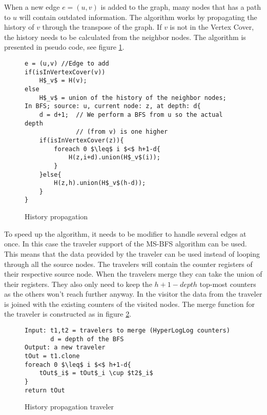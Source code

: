 When a new edge $e = (u,v)$ is added to the graph, many nodes that has a path to $u$ will contain outdated information. The algorithm works by propagating the history of $v$ through the transpose of the graph. If $v$ is not in the Vertex Cover, the history needs to be calculated from the neighbor nodes. The algorithm is presented in pseudo code, see figure \ref{fig:history_propagation_algorithm}.

\begin{figure}[h]
    \begin{lstlisting}[mathescape]
e = (u,v) //Edge to add
if(isInVertexCover(v))
    H$_v$ = H(v);
else
    H$_v$ = union of the history of the neighbor nodes;
In BFS; source: u, current node: z, at depth: d{
    d = d+1;  // We perform a BFS from u so the actual depth 
              // (from v) is one higher
    if(isInVertexCover(z)){
        foreach 0 $\leq$ i $<$ h+1-d{
            H(z,i+d).union(H$_v$(i));
        }
    }else{
        H(z,h).union(H$_v$(h-d));
    }
}
    \end{lstlisting}
    \caption{History propagation}
    \label{fig:history_propagation_algorithm}
\end{figure}

To speed up the algorithm, it needs to be modifier to handle several edges at once. In this case the traveler support of the MS-BFS algorithm can be used. This means that the data provided by the traveler can be used instead of looping through all the source nodes. The travelers will contain the counter registers of their respective source node. When the travelers merge they can take the union of their registers. They also only need to keep the $h+1-depth$ top-most counters as the others won't reach further anyway. In the visitor the data from the traveler is joined with the existing counters of the visited nodes. The merge function for the traveler is constructed as in figure \ref{fig:history_propagation_traveler}.

\begin{figure}[h]
    \begin{lstlisting}[mathescape]
Input: t1,t2 = travelers to merge (HyperLogLog counters)
       d = depth of the BFS
Output: a new traveler
tOut = t1.clone
foreach 0 $\leq$ i $<$ h+1-d{
    tOut$_i$ = tOut$_i \cup $t2$_i$
}
return tOut
    \end{lstlisting}
    \caption{History propagation traveler}
    \label{fig:history_propagation_traveler}
\end{figure}

